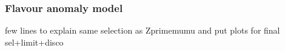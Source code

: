 \documentclass{cernrep}
\begin{document}
%
%
%
%
%

\subsubsection{Flavour anomaly model}
few lines to explain same selection as Zprimemumu and put plots for final sel+limit+disco
\end{document}
